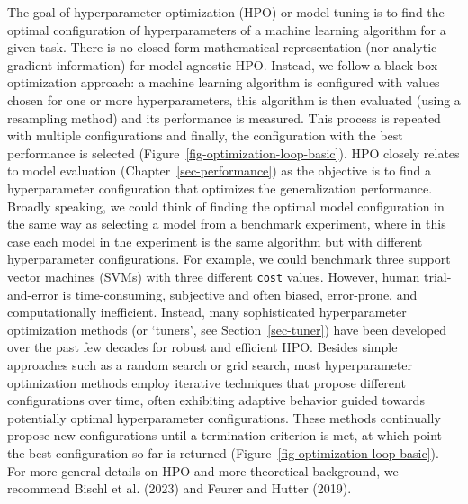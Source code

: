 The goal of hyperparameter
optimization
(HPO) or model tuning is to find the optimal configuration
of hyperparameters of a machine learning algorithm for a given task.
There is no closed-form mathematical representation (nor analytic
gradient information) for model-agnostic HPO. Instead, we follow a black
box optimization approach: a machine
learning algorithm is configured with values chosen for one or more
hyperparameters, this algorithm is then evaluated (using a resampling
method) and its performance is measured. This process is repeated with
multiple configurations and finally, the configuration with the best
performance is selected (Figure~\ref{fig-optimization-loop-basic}). HPO
closely relates to model evaluation
(Chapter~\ref{sec-performance}) as the objective is to find a
hyperparameter configuration that optimizes the generalization
performance. Broadly speaking, we could think of finding the optimal
model configuration in the same way as selecting a model from a
benchmark experiment, where in this case each model in the experiment is
the same algorithm but with different hyperparameter configurations. For
example, we could benchmark three support vector
machines (SVMs) with three different
\texttt{cost} values. However, human trial-and-error is time-consuming,
subjective and often biased, error-prone, and computationally
inefficient. Instead, many sophisticated hyperparameter optimization
methods (or `tuners', see Section~\ref{sec-tuner}) have
been developed over the past few decades for robust and efficient HPO.
Besides simple approaches such as a random search
or grid search, most hyperparameter optimization
methods employ iterative techniques that propose different
configurations over time, often exhibiting adaptive behavior guided
towards potentially optimal hyperparameter configurations. These methods
continually propose new configurations until a termination criterion is
met, at which point the best configuration so far is returned
(Figure~\ref{fig-optimization-loop-basic}). For more general details on
HPO and more theoretical background, we recommend Bischl et al. (2023)
and Feurer and Hutter (2019).

